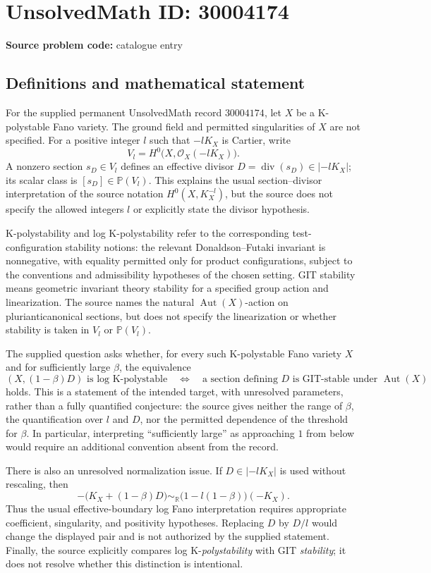 \documentclass[11pt]{article}
\begin{document}
\section*{UnsolvedMath ID: 30004174}
\textbf{Source problem code:} catalogue entry
\subsection{Definitions and mathematical statement}
For the supplied permanent UnsolvedMath record \(30004174\), let \(X\) be a K-polystable Fano variety. The ground field and permitted singularities of \(X\) are not specified. For a positive integer \(l\) such that \(-lK_X\) is Cartier, write
\[
V_l=H^0\bigl(X,\mathcal O_X(-lK_X)\bigr).
\]
A nonzero section \(s_D\in V_l\) defines an effective divisor \(D=\operatorname{div}(s_D)\in|-lK_X|\); its scalar class is \([s_D]\in\mathbb P(V_l)\). This explains the usual section--divisor interpretation of the source notation \(H^0(X,K_X^{-l})\), but the source does not specify the allowed integers \(l\) or explicitly state the divisor hypothesis.

K-polystability and log K-polystability refer to the corresponding test-configuration stability notions: the relevant Donaldson--Futaki invariant is nonnegative, with equality permitted only for product configurations, subject to the conventions and admissibility hypotheses of the chosen setting. GIT stability means geometric invariant theory stability for a specified group action and linearization. The source names the natural \(\operatorname{Aut}(X)\)-action on plurianticanonical sections, but does not specify the linearization or whether stability is taken in \(V_l\) or \(\mathbb P(V_l)\).

The supplied question asks whether, for every such K-polystable Fano variety \(X\) and for sufficiently large \(\beta\), the equivalence
\[
(X,(1-\beta)D)\text{ is log K-polystable}
\quad\Longleftrightarrow\quad
\text{a section defining }D\text{ is GIT-stable under }\operatorname{Aut}(X)
\]
holds. This is a statement of the intended target, with unresolved parameters, rather than a fully quantified conjecture: the source gives neither the range of \(\beta\), the quantification over \(l\) and \(D\), nor the permitted dependence of the threshold for \(\beta\). In particular, interpreting ``sufficiently large'' as approaching \(1\) from below would require an additional convention absent from the record.

There is also an unresolved normalization issue. If \(D\in|-lK_X|\) is used without rescaling, then
\[
-\bigl(K_X+(1-\beta)D\bigr)
\sim_{\mathbb R}\bigl(1-l(1-\beta)\bigr)(-K_X).
\]
Thus the usual effective-boundary log Fano interpretation requires appropriate coefficient, singularity, and positivity hypotheses. Replacing \(D\) by \(D/l\) would change the displayed pair and is not authorized by the supplied statement. Finally, the source explicitly compares log K-\emph{polystability} with GIT \emph{stability}; it does not resolve whether this distinction is intentional.
\end{document}
